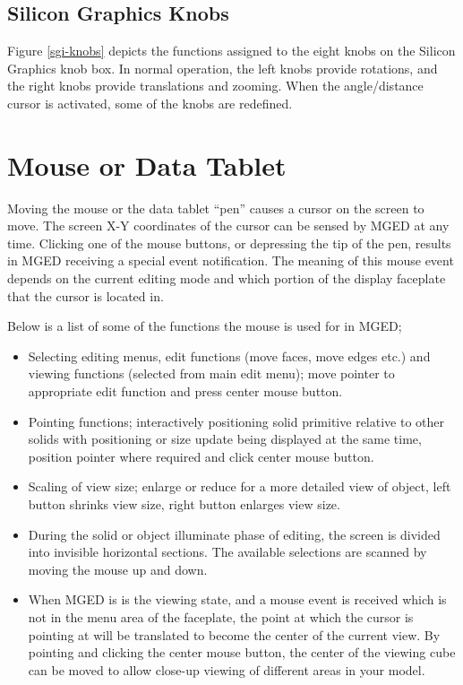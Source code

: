 \subsection{Silicon Graphics Knobs}

Figure \ref{sgi-knobs} depicts the functions assigned to the
eight knobs on the Silicon Graphics knob box.
In normal operation, the left knobs provide rotations,
and the right knobs provide translations and zooming.
When the angle/distance cursor is activated, some of the
knobs are redefined.

\section{Mouse or Data Tablet}

Moving the mouse or the data tablet ``pen'' causes a cursor
on the screen to move.
The screen X-Y coordinates of the cursor can be sensed by MGED
at any time.
Clicking one of the mouse buttons,
or depressing the tip of the pen, results in MGED receiving
a special event notification.
The meaning of this mouse event depends on the current editing mode
and which portion of the display faceplate that the cursor is located
in.

Below is a list of some of the functions the mouse is used for in MGED;
\begin{itemize}
\item
Selecting editing menus, edit functions (move faces, move edges
etc.) and viewing functions (selected from main edit menu); move
pointer to appropriate edit function and press center mouse button.
\item
Pointing functions; interactively positioning solid primitive
relative to other solids with positioning or size update being
displayed at the same time, position pointer where required and click
center mouse button.
\item
Scaling of view size; enlarge or reduce for a more detailed view of
object, left button shrinks view size, right button enlarges view
size.
\item
During the solid or object illuminate phase of editing,
the screen is divided into
invisible horizontal sections.
The available selections are scanned by moving the mouse up and down.
\item
When MGED is is the viewing state,
and a mouse event is received which is not in the menu area of the faceplate,
the point at which the cursor is pointing at will be translated to become
the center of the current view.
By pointing and clicking the center mouse button,
the center of the viewing cube
can be moved to allow close-up viewing of different areas in your
model.
\end{itemize}

